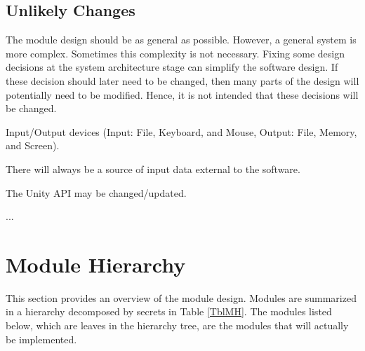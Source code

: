 \documentclass[12pt, titlepage]{article}
\newcounter{ucnum}
\newcommand{\uctheucnum}{UC\theucnum}
\begin{document}
\subsection{Unlikely Changes} \label{SecUchange}

The module design should be as general as possible. However, a general system is
more complex. Sometimes this complexity is not necessary. Fixing some design
decisions at the system architecture stage can simplify the software design. If
these decision should later need to be changed, then many parts of the design
will potentially need to be modified. Hence, it is not intended that these
decisions will be changed.

\begin{description}
\item[ \uctheucnum \label{ucIO}:] Input/Output devices
  (Input: File, Keyboard, and Mouse, Output: File, Memory, and Screen).
\item[ \uctheucnum \label{ucInput}:] There will always be
  a source of input data external to the software.
\item[ \uctheucnum \label{ucAPI}:] The Unity API may be changed/updated.
\item ...
\end{description}

\section{Module Hierarchy} \label{SecMH}

This section provides an overview of the module design. Modules are summarized
in a hierarchy decomposed by secrets in Table \ref{TblMH}. The modules listed
below, which are leaves in the hierarchy tree, are the modules that will
actually be implemented.
\end{document}
